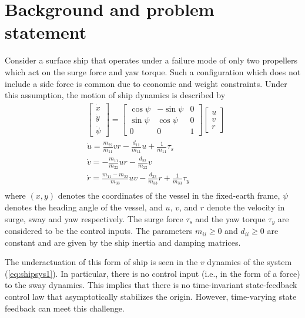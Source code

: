\documentclass[amsthm, twocolumn]{autart}
\begin{document}
\section{Background and problem statement}
Consider a surface ship that operates under a failure mode of only two propellers which act on the surge force and yaw torque. Such a configuration which does not include a side force is common due to economic and weight constraints. Under this assumption, the motion of ship dynamics is described by
%
%
\begin{equation}
\begin{aligned}
& \begin{bmatrix} \dot{x} \\  \dot{y} \\  \dot{\psi} \end{bmatrix}
 =
\begin{bmatrix} 
\cos\psi  	& -\sin\psi	 	& 0 \\  
\sin\psi 	& \cos\psi 		& 0\\  
0 		& 0			& 1
\end{bmatrix}
\begin{bmatrix} u \\  v \\  r \end{bmatrix} \\
& \dot{u} =\frac{m_{22}}{m_{11}}vr-\frac{d_{11}}{m_{11}}u+\frac{1}{m_{11}}\tau_s \\
& \dot{v} =-\frac{m_{11}}{m_{22}}ur-\frac{d_{22}}{m_{22}}v \\
& \dot{r} =\frac{m_{11}-m_{22}}{m_{33}}uv-\frac{d_{33}}{m_{33}}r+\frac{1}{m_{33}}\tau_y \\
\end{aligned}
\label{eq:shipsys1}
\end{equation}
%
%
where $(x,y)$ denotes the coordinates of the vessel in the fixed-earth frame, $\psi$ denotes the heading angle of the vessel, and $u$, $v$, and $r$ denote the velocity in surge, sway and yaw respectively. The surge force $\tau_s$ and the yaw torque $\tau_y$ are considered to be the control inputs. The parameters $m_{ii} \ge 0$ and $d_{ii} \ge 0$ are constant and are given by the ship inertia and damping matrices.

The underactuation of this form of ship is seen in the $v$ dynamics of the system (\ref{eq:shipsys1}). In particular, there is no control input (i.e., in the form of a force) to the sway dynamics. This implies that there is no time-invariant state-feedback control law that asymptotically stabilizes the origin. However, time-varying state feedback can meet this challenge. 
\end{document}
